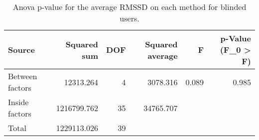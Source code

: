 
\begin{table}[!htb]
\centering
\caption{Anova p-value for the average RMSSD on each method for blinded users.}
\label{tab:anova_average_RMSSD}
\begin{tabular}{lrrrrr}
\toprule
         Source &  Squared sum &  DOF & Squared average &     F & p-Value (F\_0 > F) \\
\midrule
Between factors &    12313.264 &    4 &        3078.316 & 0.089 &             0.985 \\
 Inside factors &  1216799.762 &   35 &       34765.707 &       &                   \\
          Total &  1229113.026 &   39 &                 &       &                   \\
\bottomrule
\end{tabular}
\end{table}

